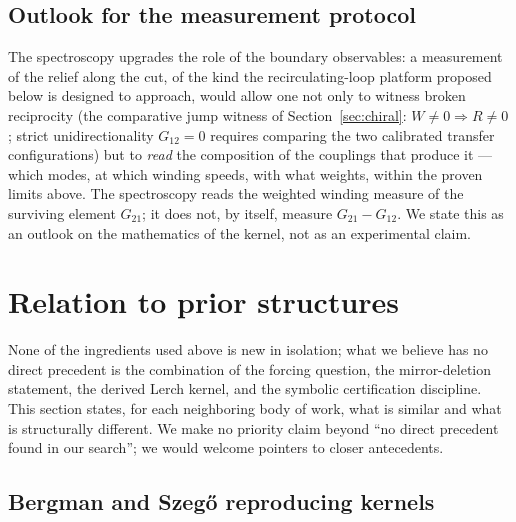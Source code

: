 \documentclass[11pt,a4paper]{article}
\begin{document}
\subsection{Outlook for the measurement protocol}
\label{sec:specoutlook}

The spectroscopy upgrades the role of the boundary observables: a
measurement of the relief along the cut, of the kind the
recirculating-loop platform proposed below is designed to approach,
would allow one not only to witness broken reciprocity (the comparative
jump witness of Section~\ref{sec:chiral}: $W \neq 0 \Rightarrow R \neq 0$;
strict unidirectionality $G_{12} = 0$ requires comparing the two calibrated
transfer configurations) but to \emph{read} the composition of the
couplings that produce it --- which modes, at which winding speeds, with
what weights, within the proven limits above. The spectroscopy reads the
weighted winding measure of the surviving element $G_{21}$; it does not, by
itself, measure $G_{21} - G_{12}$. We state this as an
outlook on the mathematics of the kernel, not as an experimental claim.

\section{Relation to prior structures}
\label{sec:prior}

None of the ingredients used above is new in isolation; what we believe has no
direct precedent is the combination of the forcing question, the mirror-deletion
statement, the derived Lerch kernel, and the symbolic certification discipline.
This section states, for each neighboring body of work, what is similar and what
is structurally different. We make no priority claim beyond ``no direct precedent
found in our search''; we would welcome pointers to closer antecedents.

\subsection{Bergman and Szeg\H{o} reproducing kernels}
\end{document}
